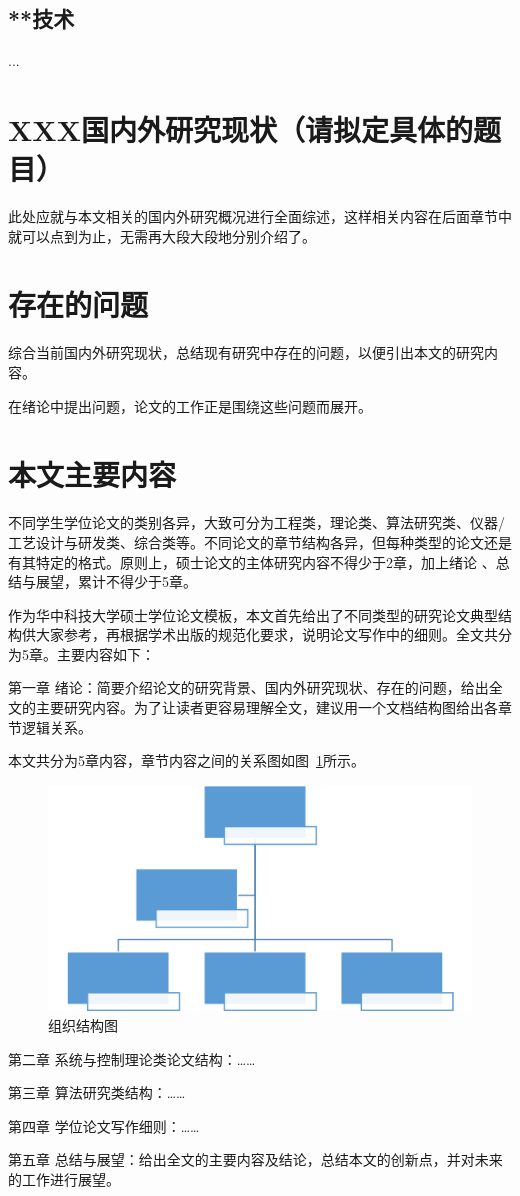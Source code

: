 \subsection{**技术}
...

\section{XXX国内外研究现状（请拟定具体的题目）}
\label{sec:requirement}
此处应就与本文相关的国内外研究概况进行全面综述，这样相关内容在后面章节中就可以点到为止，无需再大段大段地分别介绍了。



\section{存在的问题}
\label{sec:compile}

综合当前国内外研究现状，总结现有研究中存在的问题，以便引出本文的研究内容。

在绪论中提出问题，论文的工作正是围绕这些问题而展开。


\section{本文主要内容}
\label{sec:checklist}

不同学生学位论文的类别各异，大致可分为工程类，理论类、算法研究类、仪器/工艺设计与研发类、综合类等。不同论文的章节结构各异，但每种类型的论文还是有其特定的格式。原则上，硕士论文的主体研究内容不得少于2章，加上绪论 、总结与展望，累计不得少于5章。

作为华中科技大学硕士学位论文模板，本文首先给出了不同类型的研究论文典型结构供大家参考，再根据学术出版的规范化要求，说明论文写作中的细则。全文共分为5章。主要内容如下：

第一章 绪论：简要介绍论文的研究背景、国内外研究现状、存在的问题，给出全文的主要研究内容。为了让读者更容易理解全文，建议用一个文档结构图给出各章节逻辑关系。

本文共分为5章内容，章节内容之间的关系图如图~\ref{Fig1-1}所示。

\begin{figure}[!htbp]
    \centering
    \includegraphics{figures/Fig1-1.png}
    \caption{组织结构图}\label{Fig1-1}
\end{figure}

第二章 系统与控制理论类论文结构：……

第三章 算法研究类结构：……

第四章 学位论文写作细则：……

第五章 总结与展望：给出全文的主要内容及结论，总结本文的创新点，并对未来的工作进行展望。

